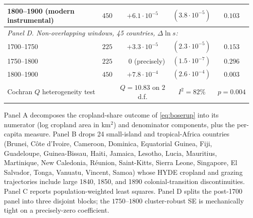 \documentclass[11pt,letterpaper]{article}
\begin{document}
\begin{table}[H]
\begin{tabular}{lcccc}
1800--1900 (modern instrumental)                     & $450$ & $+6.1\!\cdot\!10^{-5}$ & $(3.8\!\cdot\!10^{-5})$ & $0.103$ \\
\midrule
\multicolumn{5}{l}{\textit{Panel D. Non-overlapping windows, 45 countries, $\Delta \ln s$:}} \\
1700--1750                                            & $225$ & $+3.3\!\cdot\!10^{-5}$ & $(2.3\!\cdot\!10^{-5})$ & $0.153$ \\
1750--1800                                            & $225$ & $\phantom{+}0$ (precisely) & $(1.5\!\cdot\!10^{-7})$ & $0.296$ \\
1800--1900                                            & $450$ & $+7.8\!\cdot\!10^{-4}$ & $(2.6\!\cdot\!10^{-4})$ & $0.003$ \\
\hspace{1em}Cochran $Q$ heterogeneity test           &       & $Q = 10.83$ on $2$ d.f. & $I^2 = 82\%$ & $p = 0.004$ \\
\bottomrule
\end{tabular}
\par\smallskip\footnotesize{Panel A decomposes the cropland-share outcome of \eqref{eq:boserup} into its numerator (log cropland area in km$^2$) and denominator components, plus the per-capita measure. Panel B drops 24 small-island and tropical-Africa countries (Brunei, C\^ote d'Ivoire, Cameroon, Dominica, Equatorial Guinea, Fiji, Guadeloupe, Guinea-Bissau, Haiti, Jamaica, Lesotho, Lucia, Mauritius, Martinique, New Caledonia, R\'eunion, Saint-Kitts, Sierra Leone, Singapore, El Salvador, Tonga, Vanuatu, Vincent, Samoa) whose HYDE cropland and grazing trajectories include large 1840, 1850, and 1890 colonial-transition discontinuities. Panel C reports population-weighted least squares. Panel D splits the post-1700 panel into three disjoint blocks; the $1750$--$1800$ cluster-robust SE is mechanically tight on a precisely-zero coefficient.}
\end{table}
\end{document}
